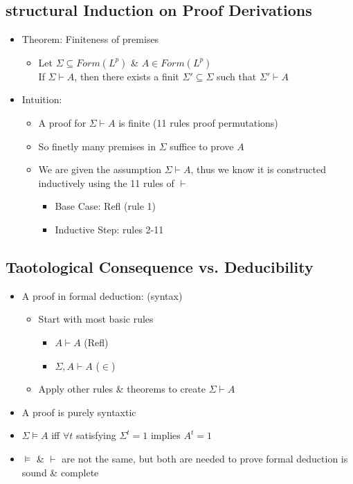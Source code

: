 \documentclass[11pt]{article}
\begin{document}
\subsection{structural Induction on Proof Derivations}
\begin{itemize}
    \item Theorem: Finiteness of premises 
    \begin{itemize}
        \item Let $\Sigma\subseteq Form(L^p)$ \& $A\in Form(L^p)$ \\
        If $\Sigma\vdash A$, then there exists a finit $\Sigma'\subseteq\Sigma$ such that $\Sigma'\vdash A$
    \end{itemize}
    \item Intuition: 
    \begin{itemize}
        \item A proof for $\Sigma\vdash A$ is finite (11 rules proof permutations)
        \item So finetly many premises in $\Sigma$ suffice to prove $A$
        \item We are given the assumption $\Sigma\vdash A$, thus we know it is constructed inductively using the 11 rules of $\vdash$ 
        \begin{itemize}
            \item Base Case: Refl (rule 1)
            \item Inductive Step: rules 2-11 
        \end{itemize}
    \end{itemize}
\end{itemize}
\subsection{Taotological Consequence vs. Deducibility}
\begin{itemize}
    \item A proof in formal deduction: (syntax)
    \begin{itemize}
        \item Start with most basic rules 
        \begin{itemize}
            \item $A\vdash A$ (Refl)
            \item $\Sigma, A\vdash A$ ($\in$)
        \end{itemize}
        \item Apply other rules \& theorems to create $\Sigma\vdash A$
    \end{itemize}
    \item A proof is purely syntaxtic
    \item $\Sigma \vDash A$ iff $\forall t$ satisfying $\Sigma^t = 1$ implies $A^t=1$
    \item $\vDash$ \& $\vdash$ are not the same, but both are needed to prove formal deduction is sound \& complete
\end{itemize}
\end{document}
